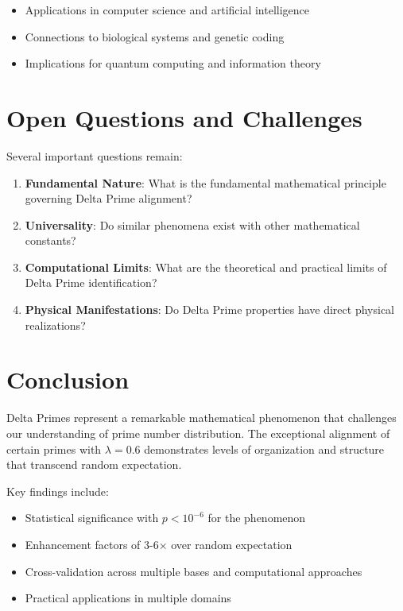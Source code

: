 \documentclass[12pt,a4paper]{report}
\newcommand{\lambdaval}{\lambda}
\begin{document}
\begin{itemize}
\begin{itemize}
\item Applications in computer science and artificial intelligence
\item Connections to biological systems and genetic coding
\item Implications for quantum computing and information theory
\end{itemize}

\section{Open Questions and Challenges}

Several important questions remain:

\begin{enumerate}
\item \textbf{Fundamental Nature}: What is the fundamental mathematical principle governing Delta Prime alignment?
\item \textbf{Universality}: Do similar phenomena exist with other mathematical constants?
\item \textbf{Computational Limits}: What are the theoretical and practical limits of Delta Prime identification?
\item \textbf{Physical Manifestations}: Do Delta Prime properties have direct physical realizations?
\end{enumerate}

\section{Conclusion}

Delta Primes represent a remarkable mathematical phenomenon that challenges our understanding of prime number distribution. The exceptional alignment of certain primes with $\lambdaval = 0.6$ demonstrates levels of organization and structure that transcend random expectation.

Key findings include:
\begin{itemize}
\item Statistical significance with $p < 10^{-6}$ for the phenomenon
\item Enhancement factors of 3-6× over random expectation
\item Cross-validation across multiple bases and computational approaches
\item Practical applications in multiple domains
\end{itemize}


\end{itemize}
\end{document}
